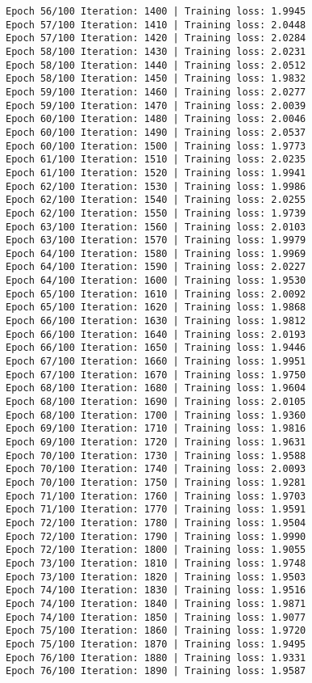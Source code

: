 \documentclass[11pt]{article}
\begin{document}
\begin{Verbatim}[commandchars=\\\{\}]
Epoch 56/100 Iteration: 1400 | Training loss: 1.9945
Epoch 57/100 Iteration: 1410 | Training loss: 2.0448
Epoch 57/100 Iteration: 1420 | Training loss: 2.0284
Epoch 58/100 Iteration: 1430 | Training loss: 2.0231
Epoch 58/100 Iteration: 1440 | Training loss: 2.0512
Epoch 58/100 Iteration: 1450 | Training loss: 1.9832
Epoch 59/100 Iteration: 1460 | Training loss: 2.0277
Epoch 59/100 Iteration: 1470 | Training loss: 2.0039
Epoch 60/100 Iteration: 1480 | Training loss: 2.0046
Epoch 60/100 Iteration: 1490 | Training loss: 2.0537
Epoch 60/100 Iteration: 1500 | Training loss: 1.9773
Epoch 61/100 Iteration: 1510 | Training loss: 2.0235
Epoch 61/100 Iteration: 1520 | Training loss: 1.9941
Epoch 62/100 Iteration: 1530 | Training loss: 1.9986
Epoch 62/100 Iteration: 1540 | Training loss: 2.0255
Epoch 62/100 Iteration: 1550 | Training loss: 1.9739
Epoch 63/100 Iteration: 1560 | Training loss: 2.0103
Epoch 63/100 Iteration: 1570 | Training loss: 1.9979
Epoch 64/100 Iteration: 1580 | Training loss: 1.9969
Epoch 64/100 Iteration: 1590 | Training loss: 2.0227
Epoch 64/100 Iteration: 1600 | Training loss: 1.9530
Epoch 65/100 Iteration: 1610 | Training loss: 2.0092
Epoch 65/100 Iteration: 1620 | Training loss: 1.9868
Epoch 66/100 Iteration: 1630 | Training loss: 1.9812
Epoch 66/100 Iteration: 1640 | Training loss: 2.0193
Epoch 66/100 Iteration: 1650 | Training loss: 1.9446
Epoch 67/100 Iteration: 1660 | Training loss: 1.9951
Epoch 67/100 Iteration: 1670 | Training loss: 1.9750
Epoch 68/100 Iteration: 1680 | Training loss: 1.9604
Epoch 68/100 Iteration: 1690 | Training loss: 2.0105
Epoch 68/100 Iteration: 1700 | Training loss: 1.9360
Epoch 69/100 Iteration: 1710 | Training loss: 1.9816
Epoch 69/100 Iteration: 1720 | Training loss: 1.9631
Epoch 70/100 Iteration: 1730 | Training loss: 1.9588
Epoch 70/100 Iteration: 1740 | Training loss: 2.0093
Epoch 70/100 Iteration: 1750 | Training loss: 1.9281
Epoch 71/100 Iteration: 1760 | Training loss: 1.9703
Epoch 71/100 Iteration: 1770 | Training loss: 1.9591
Epoch 72/100 Iteration: 1780 | Training loss: 1.9504
Epoch 72/100 Iteration: 1790 | Training loss: 1.9990
Epoch 72/100 Iteration: 1800 | Training loss: 1.9055
Epoch 73/100 Iteration: 1810 | Training loss: 1.9748
Epoch 73/100 Iteration: 1820 | Training loss: 1.9503
Epoch 74/100 Iteration: 1830 | Training loss: 1.9516
Epoch 74/100 Iteration: 1840 | Training loss: 1.9871
Epoch 74/100 Iteration: 1850 | Training loss: 1.9077
Epoch 75/100 Iteration: 1860 | Training loss: 1.9720
Epoch 75/100 Iteration: 1870 | Training loss: 1.9495
Epoch 76/100 Iteration: 1880 | Training loss: 1.9331
Epoch 76/100 Iteration: 1890 | Training loss: 1.9587

\end{Verbatim}
\end{document}
